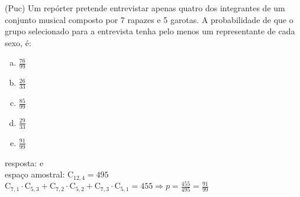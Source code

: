 \begin{ex}
    (Puc) Um repórter pretende entrevistar apenas quatro dos integrantes de um conjunto musical composto por 7 rapazes e 5 garotas. A probabilidade de que o grupo selecionado para a entrevista tenha pelo menos um representante de cada sexo, é:
   \begin{enumerate}[(a)]
   \item $\frac{76}{99}$
   \item $\frac{26}{33}$
   \item $\frac{85}{99}$
   \item $\frac{29}{33}$
   \item $\frac{91}{99}$
   \end{enumerate}
      \begin{sol}
        resposta: e \\
        espaço amostral: $\mathrm{C}_{{12},4}=495$ \\
        $\mathrm{C}_{7,1}\cdot\mathrm{C}_{5,3} + \mathrm{C}_{7,2}\cdot\mathrm{C}_{5,2} +\mathrm{C}_{7,3}\cdot\mathrm{C}_{5,1}= 455 \Longrightarrow p=\frac{455}{495}=\frac{91}{99}$ 
      \end{sol}
\end{ex}